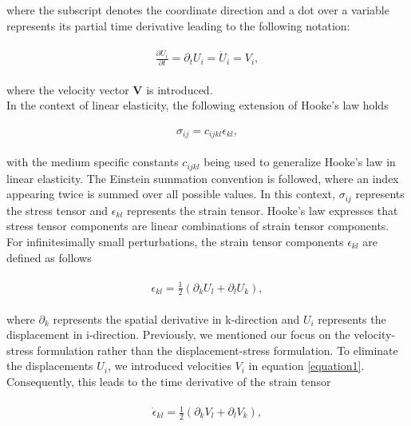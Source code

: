 where the subscript denotes the coordinate direction and a dot over a variable represents its partial time derivative leading to the following notation:

\begin{align}
    \begin{split}
        \frac{\partial U_i}{\partial t} = \partial_t U_i = \dot{U}_i = V_i,
    \end{split}
    \label{equation1}
\end{align}

where the velocity vector \textbf{V} is introduced. \\

In the context of linear elasticity, the following extension of Hooke's law holds

\begin{align}
    \begin{split}
        \sigma_{ij} = c_{ijkl}\epsilon_{kl},
    \end{split}
    \label{eq:hookeslaw}
\end{align}

with the medium specific constants $c_{ijkl}$ being used to generalize Hooke's law in linear elasticity. The Einstein summation convention
is followed, where an index appearing twice is summed over all possible values. In this context, $\sigma_{ij}$ represents the stress tensor
and $\epsilon_{kl}$ represents the strain tensor. Hooke's law expresses that stress tensor components are linear combinations of strain tensor
components. For infinitesimally small perturbations, the strain tensor components $\epsilon_{kl}$ are defined as follows

\begin{align}
    \begin{split}
        \epsilon_{kl} = \frac{1}{2}\left(\partial_k U_l + \partial_l U_k \right) ,
    \end{split}
\end{align}

where $\partial_k$ represents the spatial derivative in k-direction and $U_i$ represents the displacement in i-direction.
Previously, we mentioned our focus on the velocity-stress formulation rather than the displacement-stress formulation.
To eliminate the displacements $U_i$, we introduced velocities $V_i$ in equation \ref{equation1}.
Consequently, this leads to the time derivative of the strain tensor

\begin{align}
    \begin{split}
        \dot{\epsilon}_{kl} = \frac{1}{2}\left( \partial_k V_l + \partial_l V_k \right) ,
    \end{split}
\end{align}

